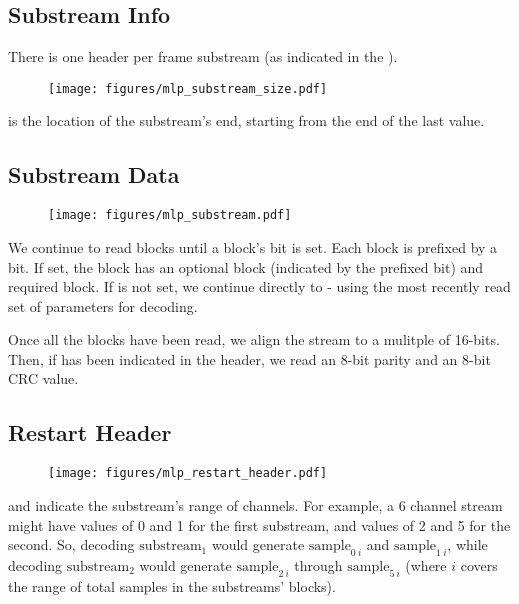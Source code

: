 \subsection{Substream Info}
There is one  header per frame substream
(as indicated in the ).
\begin{figure}[h]
\texttt{[image: figures/mlp\_substream\_size.pdf]}
\end{figure}
\par
\noindent
{} is the location of the substream's end,
starting from the end of the last  value.

\clearpage

\subsection{Substream Data}

\begin{figure}[h]
\texttt{[image: figures/mlp\_substream.pdf]}
\end{figure}
We continue to read blocks until a block's  bit is set.
Each block is prefixed by a  bit.
If set, the block has an optional  block
(indicated by the prefixed  bit)
and required  block.
If  is not set, we continue directly to
 - using the most recently read set of parameters for
decoding.

Once all the blocks have been read, we align the stream to a
mulitple of 16-bits.
Then, if  has been indicated in the
 header, we read an 8-bit parity
and an 8-bit CRC value.

\subsection{Restart Header}
\begin{figure}[h]
\texttt{[image: figures/mlp\_restart\_header.pdf]}
\end{figure}
\par
\noindent
{} and  indicate the substream's
range of channels.
For example, a 6 channel stream might have values of 0 and 1
for the first substream, and values of 2 and 5 for the second.
So, decoding $\text{substream}_1$ would generate $\text{sample}_{0~i}$
and $\text{sample}_{1~i}$, while decoding $\text{substream}_2$ would
generate $\text{sample}_{2~i}$ through $\text{sample}_{5~i}$
(where $i$ covers the range of total samples in the substreams' blocks).


